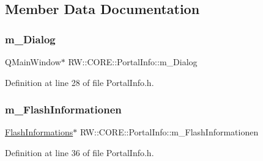 \subsection{Member Data Documentation}
\hypertarget{class_r_w_1_1_c_o_r_e_1_1_portal_info_ab377e834cdc7264c3d7f0d7c35c2bc6f}{}\label{class_r_w_1_1_c_o_r_e_1_1_portal_info_ab377e834cdc7264c3d7f0d7c35c2bc6f} 
\subsubsection{\texorpdfstring{m\+\_\+\+Dialog}{m\_Dialog}}
{\footnotesize\ttfamily Q\+Main\+Window$\ast$ R\+W\+::\+C\+O\+R\+E\+::\+Portal\+Info\+::m\+\_\+\+Dialog\hspace{0.3cm}{\ttfamily [private]}}



Definition at line 28 of file Portal\+Info.\+h.

\hypertarget{class_r_w_1_1_c_o_r_e_1_1_portal_info_a2cf39162f662b4cc27ee32edbe360907}{}\label{class_r_w_1_1_c_o_r_e_1_1_portal_info_a2cf39162f662b4cc27ee32edbe360907} 
\subsubsection{\texorpdfstring{m\+\_\+\+Flash\+Informationen}{m\_FlashInformationen}}
{\footnotesize\ttfamily \hyperlink{class_r_w_1_1_c_o_r_e_1_1_flash_informations}{Flash\+Informations}$\ast$ R\+W\+::\+C\+O\+R\+E\+::\+Portal\+Info\+::m\+\_\+\+Flash\+Informationen\hspace{0.3cm}{\ttfamily [private]}}



Definition at line 36 of file Portal\+Info.\+h.

\hypertarget{class_r_w_1_1_c_o_r_e_1_1_portal_info_a8c82ce1d24c210b2e24f6844be8172ff}{}\label{class_r_w_1_1_c_o_r_e_1_1_portal_info_a8c82ce1d24c210b2e24f6844be8172ff} 
